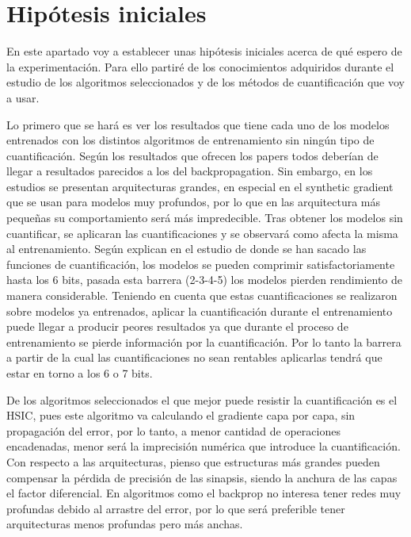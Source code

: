 \section{Hipótesis iniciales}

En este apartado voy a establecer unas hipótesis iniciales acerca de qué espero de la experimentación. Para ello partiré de los conocimientos adquiridos durante el estudio de los algoritmos seleccionados y de los métodos de cuantificación que voy a usar. 

Lo primero que se hará es ver los resultados que tiene cada uno de los modelos entrenados con los distintos algoritmos de entrenamiento sin ningún tipo de cuantificación. Según los resultados que ofrecen los papers todos deberían de llegar a resultados parecidos a los del backpropagation. Sin embargo, en los estudios se presentan arquitecturas grandes, en especial en el synthetic gradient que se usan para modelos muy profundos, por lo que en las arquitectura más pequeñas su comportamiento será más impredecible. Tras obtener los modelos sin cuantificar, se aplicaran las cuantificaciones y se observará como afecta la misma al entrenamiento. Según explican en el estudio de donde se han sacado las funciones de cuantificación, los modelos se pueden comprimir satisfactoriamente hasta los 6 bits, pasada esta barrera (2-3-4-5) los modelos pierden rendimiento de manera considerable. Teniendo en cuenta que estas cuantificaciones se realizaron sobre modelos ya entrenados, aplicar la cuantificación durante el entrenamiento puede llegar a producir peores resultados ya que durante el proceso de entrenamiento se pierde información por la cuantificación. Por lo tanto la barrera a partir de la cual las cuantificaciones no sean rentables aplicarlas tendrá que estar en torno a los 6 o 7 bits.  

De los algoritmos seleccionados el que mejor puede resistir la cuantificación es el HSIC, pues este algoritmo va calculando el gradiente capa por capa, sin propagación del error, por lo tanto, a menor cantidad de operaciones encadenadas, menor será la imprecisión numérica que introduce la cuantificación. Con respecto a las arquitecturas, pienso que estructuras más grandes pueden compensar la pérdida de precisión de las sinapsis, siendo la anchura de las capas el factor diferencial. En algoritmos como el backprop no interesa tener redes muy profundas debido al arrastre del error, por lo que será preferible tener arquitecturas menos profundas pero más anchas. 